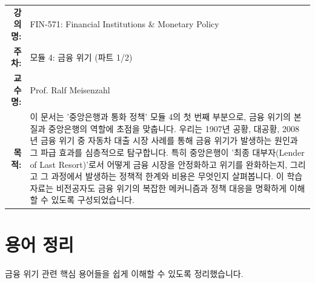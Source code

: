 \documentclass[11pt,a4paper]{book}
\makeatletter
\theoremstyle{definition}
\newcommand{\metainfo}[4]{
\begin{tcolorbox}[
    colback=lightpurple,
    colframe=darkpurple,
    boxrule=1pt,
    arc=2mm,
    left=10pt,
    right=10pt,
    top=8pt,
    bottom=8pt
]
\begin{tabular}{@{}rl@{}}
\textbf{강의명:} & #1 \\[0.3em]
\textbf{주차:} & #2 \\[0.3em]
\textbf{교수명:} & #3 \\[0.3em]
\textbf{목적:} & \begin{minipage}[t]{0.75\textwidth}#4\end{minipage}
\end{tabular}
\end{tcolorbox}
}
\makeatother
\begin{document}
\metainfo{FIN-571: Financial Institutions \& Monetary Policy}{모듈 4: 금융 위기 (파트 1/2)}{Prof. Ralf Meisenzahl}{이 문서는 '중앙은행과 통화 정책' 모듈 4의 첫 번째 부분으로, 금융 위기의 본질과 중앙은행의 역할에 초점을 맞춥니다. 우리는 1907년 공황, 대공황, 2008년 금융 위기 중 자동차 대출 시장 사례를 통해 금융 위기가 발생하는 원인과 그 파급 효과를 심층적으로 탐구합니다. 특히 중앙은행이 '최종 대부자(Lender of Last Resort)'로서 어떻게 금융 시장을 안정화하고 위기를 완화하는지, 그리고 그 과정에서 발생하는 정책적 한계와 비용은 무엇인지 살펴봅니다. 이 학습 자료는 비전공자도 금융 위기의 복잡한 메커니즘과 정책 대응을 명확하게 이해할 수 있도록 구성되었습니다.}


\section{용어 정리}
금융 위기 관련 핵심 용어들을 쉽게 이해할 수 있도록 정리했습니다.
\end{document}
